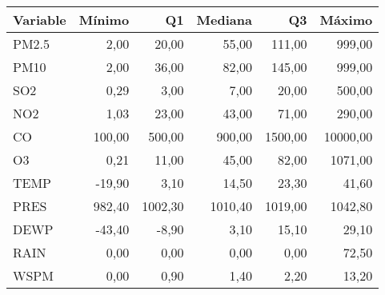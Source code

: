 \begin{table}[ht]
\centering
\begin{tabular}{lrrrrr}
  \hline
Variable & Mínimo & Q1 & Mediana & Q3 & Máximo \\ 
  \hline
PM2.5 & 2,00 & 20,00 & 55,00 & 111,00 & 999,00 \\ 
  PM10 & 2,00 & 36,00 & 82,00 & 145,00 & 999,00 \\ 
  SO2 & 0,29 & 3,00 & 7,00 & 20,00 & 500,00 \\ 
  NO2 & 1,03 & 23,00 & 43,00 & 71,00 & 290,00 \\ 
  CO & 100,00 & 500,00 & 900,00 & 1500,00 & 10000,00 \\ 
  O3 & 0,21 & 11,00 & 45,00 & 82,00 & 1071,00 \\ 
  TEMP & -19,90 & 3,10 & 14,50 & 23,30 & 41,60 \\ 
  PRES & 982,40 & 1002,30 & 1010,40 & 1019,00 & 1042,80 \\ 
  DEWP & -43,40 & -8,90 & 3,10 & 15,10 & 29,10 \\ 
  RAIN & 0,00 & 0,00 & 0,00 & 0,00 & 72,50 \\ 
  WSPM & 0,00 & 0,90 & 1,40 & 2,20 & 13,20 \\ 
   \hline
\end{tabular}
\end{table}
